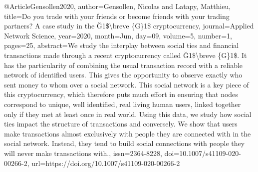 @Article{Gensollen2020,
author={Gensollen, Nicolas
and Latapy, Matthieu},
title={Do you trade with your friends or become friends with your trading partners? A case study in the {\u{G}}1{\$}{\backslash}breve {\{}G{\}}1{\$} cryptocurrency},
journal={Applied Network Science},
year={2020},
month={Jun},
day={09},
volume={5},
number={1},
pages={25},
abstract={We study the interplay between social ties and financial transactions made through a recent cryptocurrency called {\u{G}}1{\$}{\backslash}breve {\{}G{\}}1{\$}. It has the particularity of combining the usual transaction record with a reliable network of identified users. This gives the opportunity to observe exactly who sent money to whom over a social network. This social network is a key piece of this cryptocurrency, which therefore puts much effort in ensuring that nodes correspond to unique, well identified, real living human users, linked together only if they met at least once in real world. Using this data, we study how social ties impact the structure of transactions and conversely. We show that users make transactions almost exclusively with people they are connected with in the social network. Instead, they tend to build social connections with people they will never make transactions with.},
issn={2364-8228},
doi={10.1007/s41109-020-00266-2},
url={https://doi.org/10.1007/s41109-020-00266-2}
}

